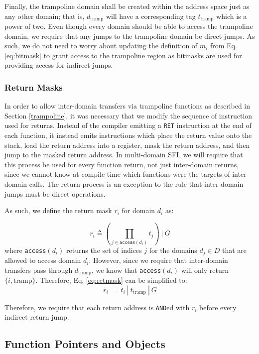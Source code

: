 \documentclass[12pt]{IEEEtran}
\begin{document}
Finally, the trampoline domain shall be created within the address space just as any other domain; that is, $d_\text{tramp}$ will have a corresponding tag $t_\text{tramp}$ which is a power of two. Even though every domain should be able to access the trampoline domain, we require that any jumps to the trampoline domain be direct jumps. As such, we do not need to worry about updating the definition of $m_i$ from Eq. \ref{eq:bitmask} to grant access to the trampoline region as bitmasks are used for providing access for indirect jumps.


\subsubsection{Return Masks} \label{retmasks}

In order to allow inter-domain transfers via trampoline functions as described in Section \ref{trampoline}, it was necessary that we modify the sequence of instruction used for returns. Instead of the compiler emitting a \texttt{RET} instruction at the end of each function, it instead emits instructions which place the return value onto the stack, load the return address into a register, mask the return address, and then jump to the masked return address. In multi-domain SFI, we will require that this process be used for every function return, not just inter-domain returns, since we cannot know at compile time which functions were the targets of inter-domain calls. The return process is an exception to the rule that inter-domain jumps must be direct operations.

As such, we define the return mask $r_i$ for domain $d_i$ as:

\begin{equation} \label{eq:retmask}
r_i \triangleq (\prod_{j\in\texttt{access}(d_i)}t_j)\ |\ G
\end{equation}
where \texttt{access}$(d_i)$ returns the set of indices $j$ for the domains $d_j\in D$ that are allowed to access domain $d_i$. However, since we require that inter-domain transfers pass through $d_\text{tramp}$, we know that \texttt{access}$(d_i)$ will only return $\{i,\text{tramp}\}$. Therefore, Eq. \ref{eq:retmask} can be simplified to:
$$ r_i\ =\ t_i\ |\ t_\text{tramp}\ |\ G $$

Therefore, we require that each return address is \texttt{AND}ed with $r_i$ before every indirect return jump.

\subsection{Function Pointers and Objects}
\end{document}
